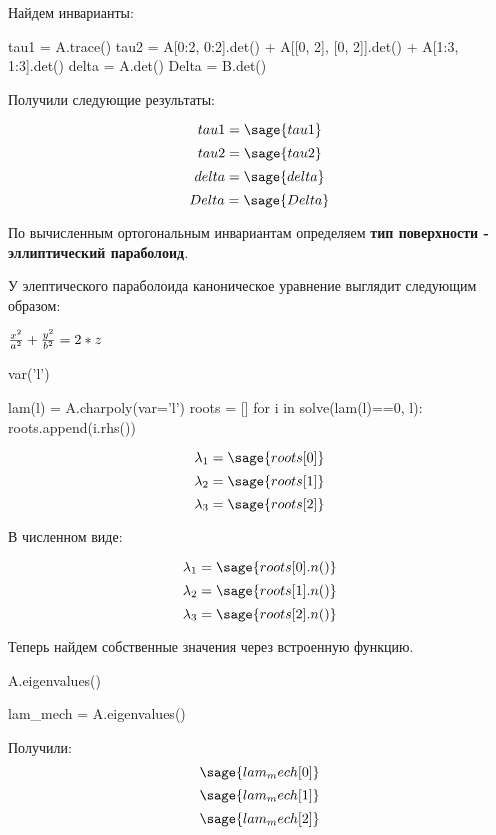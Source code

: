 \documentclass{article}
\begin{document}
Найдем инварианты:

\begin{sageblock}
tau1 = A.trace()
tau2 = A[0:2, 0:2].det() + A[[0, 2], [0, 2]].det() + A[1:3, 1:3].det()
delta = A.det()
Delta = B.det()
\end{sageblock}

Получили следующие результаты:

\begin{center}
$$tau1 = \sage{tau1}$$
$$tau2 = \sage{tau2}$$
$$delta = \sage{delta}$$
$$Delta = \sage{Delta}$$
\end{center}

По вычисленным ортогональным инвариантам определяем \textbf{тип поверхности - эллиптический параболоид}.

У элептического параболоида каноническое уравнение выглядит следующим образом:

\begin{center}
$\Large \frac{x^2}{a^2} + \frac{y^2}{b^2} = 2*z$
\end{center}

\begin{sagesilent}
var('l')
\end{sagesilent}

\begin{sageblock}
lam(l) = A.charpoly(var='l')
roots = []
for i in solve(lam(l)==0, l):
    roots.append(i.rhs())
\end{sageblock}

\begin{center}
$$\lambda_1 = \sage{roots[0]}$$
$$\lambda_2 = \sage{roots[1]}$$
$$\lambda_3 = \sage{roots[2]}$$

В численном виде: 

$$\lambda_1 = \sage{roots[0].n()}$$
$$\lambda_2 = \sage{roots[1].n()}$$
$$\lambda_3 = \sage{roots[2].n()}$$

\end{center}

Теперь найдем собственные значения через встроенную функцию.

\begin{sageblock}
A.eigenvalues()
\end{sageblock}

\begin{sagesilent}
lam_mech = A.eigenvalues()
\end{sagesilent}

Получили: 
$$\sage{lam_mech[0]}$$
$$\sage{lam_mech[1]}$$
$$\sage{lam_mech[2]}$$ 
\end{document}
